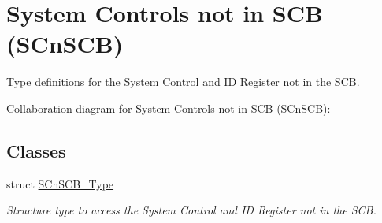 \hypertarget{group__CMSIS__SCnSCB}{}\section{System Controls not in S\+CB (S\+Cn\+S\+CB)}
\label{group__CMSIS__SCnSCB}


Type definitions for the System Control and ID Register not in the S\+CB.  


Collaboration diagram for System Controls not in S\+CB (S\+Cn\+S\+CB)\+:
\subsection*{Classes}
\begin{DoxyCompactItemize}
\item 
struct \hyperlink{structSCnSCB__Type}{S\+Cn\+S\+C\+B\+\_\+\+Type}
\begin{DoxyCompactList}\small\item\em Structure type to access the System Control and ID Register not in the S\+CB. \end{DoxyCompactList}\end{DoxyCompactItemize}
